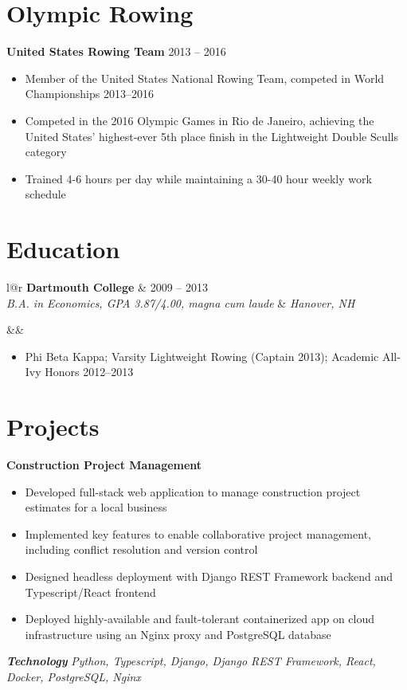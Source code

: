\documentclass[10pt,letterpaper]{moderncv}
\makeatletter
\renewcommand*{\cventry}[7][.25em]{%
  \begin{tabular*}{\maincolumnwidth}{l@{\extracolsep{\fill}}r}%
    \ifboolexpr{%
      test {\ifstrempty{#4}}
      and
      test {\ifstrempty{#2}}}%
      {}%
      {{\fontsize{9}{10.8}\selectfont\bfseries #4} & {#2}\\}%
    {\itshape #3\ifstrempty{#6}{}{, #6}} & {\itshape #5}\\%
  \end{tabular*}%
  \ifx&#7&%
  \else{\\%
    \begin{minipage}{\maincolumnwidth}%
      \small#7%
    \end{minipage}}\fi%
  \par\addvspace{#1}}
\makeatother
\begin{document}
\section{Olympic Rowing}

{\fontsize{9}{10.8}\selectfont\bfseries\textcolor[rgb]{0,0,1}{United States Rowing Team}} \hfill {2013 -- 2016}
\begin{itemize}
  \item Member of the United States National Rowing Team, competed in World Championships 2013--2016
  \item Competed in the 2016 Olympic Games in Rio de Janeiro, achieving the United States' highest-ever 5th place finish in the Lightweight Double Sculls category
  \item Trained 4-6 hours per day while maintaining a 30-40 hour weekly work schedule
\end{itemize}

\section{Education}

\cventry{2009 -- 2013}{B.A. in Economics, GPA 3.87/4.00, \textit{magna cum laude}}{\textcolor[rgb]{0,0,1}{Dartmouth College}}{Hanover, NH}{}{}
\begin{itemize}
  \item Phi Beta Kappa; Varsity Lightweight Rowing (Captain 2013); Academic All-Ivy Honors 2012--2013
\end{itemize}

\section{Projects}

{\fontsize{9}{10.8}\selectfont\bfseries\textcolor[rgb]{0,0,1}{Construction Project Management}}
\begin{itemize}
  \item Developed full-stack web application to manage construction project estimates for a local business
  \item Implemented key features to enable collaborative project management, including conflict resolution and version control
  \item Designed headless deployment with Django REST Framework backend and Typescript/React frontend
  \item Deployed highly-available and fault-tolerant containerized app on cloud infrastructure using an Nginx proxy and PostgreSQL database
\end{itemize}
\vspace{0.2em}
\textbf{\textit{Technology}} \textit{Python, Typescript, Django, Django REST Framework, React, Docker, PostgreSQL, Nginx}
\end{document}
